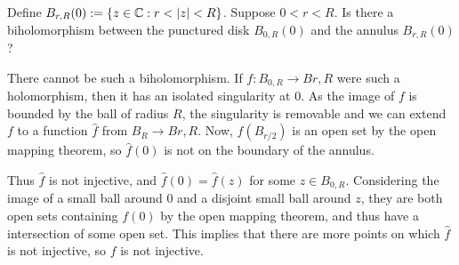 \documentclass{homework}
\begin{document}
                                                                                                                                          \begin{problem}
                                                                                                                                            Define \(B_{r,R}(0) := \{ z \in \mathbb{C} : r < |z| < R \}\). 
                                                                                                                                              Suppose $0 < r < R$.  Is there a biholomorphism between the
                                                                                                                                                punctured disk $B_{0,R}(0)$ and the annulus $B_{r,R}(0)$?
                                                                                                                                                \end{problem}
                                                                                                                                                \begin{solution}
                                                                                                                                                There cannot be such a biholomorphism. If $f:B_{0, R} \to B{r, R}$ were such a holomorphism, then it has an isolated singularity at 0. 
                                                                                                                                                As the image of $f$ is bounded by the ball of radius $R$, the singularity is removable and we can extend $f$ to a function $\hat{f}$ from $B_{R} \to B{r, R}$. Now, $f(B_{r/2})$ is an open set by the open mapping theorem, so $\hat{f}(0)$ is not on the boundary of the annulus. 

                                                                                                                                                Thus $\hat{f}$ is not injective, and $\hat{f}(0) = \hat{f}(z)$ for some $z\in B_{0, R}$. Considering the image of a small ball around $0$ and a disjoint small ball around $z$, they are both open sets containing $f(0)$ by the open mapping theorem, and thus have a intersection of some open set. This implies that there are more points on which $\hat{f}$ is not injective, so $f$ is not injective.

                                                                                                                                                \end{solution}
\end{document}
